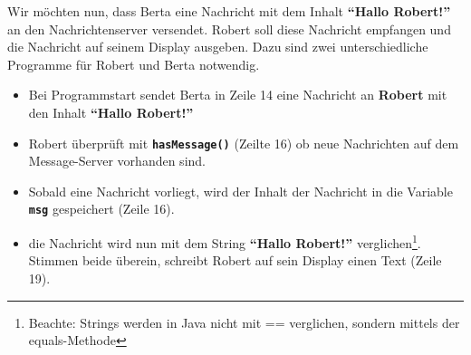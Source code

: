 \documentclass[
	12pt,
	article,
	type=bsc, %
	colorbacktitle,
	instlogo,
	accentcolor=tud1c,
	german,
	twoside
]{tudexercise}
\newcommand{\solpath}[0]{../../impl/androidApp/app/src/main/java/org/mindroid/android/app/workshopSolutions}
\newcommand{\bfcode}[1]{\texttt{\textbf{#1}}}
\begin{document}
Wir möchten nun, dass Berta eine Nachricht mit dem Inhalt \textbf{``Hallo Robert!''} an den Nachrichtenserver versendet. Robert soll diese Nachricht empfangen und die Nachricht auf seinem Display ausgeben. 
Dazu sind zwei unterschiedliche Programme für Robert und Berta notwendig.

\begin{itemize}
\item Bei Programmstart sendet Berta in Zeile 14 eine Nachricht an \textbf{Robert }mit den Inhalt \textbf{``Hallo Robert!''}
\end{itemize}



\begin{itemize}
\item Robert überprüft mit \bfcode{hasMessage()} (Zeilte 16) ob neue Nachrichten auf dem Message-Server vorhanden sind. 
\item Sobald eine Nachricht vorliegt, wird der Inhalt der Nachricht in die Variable \bfcode{msg} gespeichert (Zeile 16).
\item die Nachricht wird nun mit dem String \textbf{``Hallo Robert!''} verglichen\footnote{Beachte: Strings werden in Java nicht mit == verglichen, sondern mittels der equals-Methode}. Stimmen beide überein, schreibt Robert auf sein Display einen Text (Zeile 19).
\end{itemize}
\end{document}
